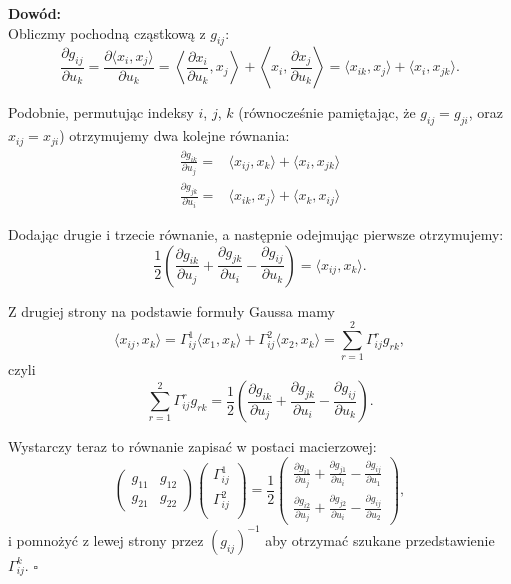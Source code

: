 \begin{frame}

\textcolor{ared}{\textbf{Dowód: }}\\\pause
Obliczmy pochodną cząstkową z $g_{ij}$:
\[\frac{\partial{g_{ij}}}{\partial u_k}=\frac{\partial\langle x_i,x_j \rangle}{\partial u_k}=\left\langle \frac{\partial x_i}{\partial u_k},x_j \right\rangle + \left\langle x_i,\frac{\partial x_j}{\partial u_k}\right\rangle=\langle x_{ik},x_j\rangle+\langle x_i,x_{jk}\rangle.\]


\pause Podobnie, permutując indeksy $i$, $j$, $k$ (równocześnie pamiętając, że $g_{ij}=g_{ji}$, oraz $x_{ij}=x_{ji}$) otrzymujemy dwa kolejne równania:
\begin{align*}
\frac{\partial{g_{ik}}}{\partial u_j}=&\langle x_{ij},x_k\rangle+\langle x_i,x_{jk}\rangle\\
\frac{\partial{g_{jk}}}{\partial u_i}=&\langle x_{ik},x_j\rangle+\langle x_k,x_{ij}\rangle
\end{align*}

\pause Dodając drugie i trzecie równanie, a następnie odejmując pierwsze otrzymujemy:
\[\frac{1}{2}\left(\frac{\partial{g_{ik}}}{\partial u_j}+\frac{\partial{g_{jk}}}{\partial u_i}- \frac{\partial{g_{ij}}}{\partial u_k}\right)=\langle x_{ij},x_{k}\rangle.\]

\end{frame}
\begin{frame}

Z drugiej strony na podstawie formuły Gaussa mamy 
\[\langle x_{ij},x_{k}\rangle=\Gamma^1_{ij}\langle x_1,x_k\rangle+ \Gamma^2_{ij}\langle x_2,x_k\rangle=\sum_{r=1}^2\Gamma^r_{ij}g_{rk},\]
\pause czyli 
\[\sum_{r=1}^2\Gamma^r_{ij}g_{rk}=\frac{1}{2}\left(\frac{\partial{g_{ik}}}{\partial u_j}+\frac{\partial{g_{jk}}}{\partial u_i}- \frac{\partial{g_{ij}}}{\partial u_k}\right).\]


\pause Wystarczy teraz to równanie zapisać w postaci macierzowej:
\[
\left(
\begin{array}{cc}
g_{11} & g_{12}\\
g_{21} & g_{22}
\end{array}
\right) 
\left(
\begin{array}{c}
\Gamma^1_{ij}\\
\Gamma^2_{ij}\\
\end{array}
\right)
=\frac{1}{2}\!
\left(
\begin{array}{c}
\frac{\partial g_{i1}}{\partial u_j}+\frac{\partial g_{j1}}{\partial u_i}-\frac{\partial g_{ij}}{\partial u_1}\\
\frac{\partial g_{i2}}{\partial u_j}+\frac{\partial g_{j2}}{\partial u_i}-\frac{\partial g_{ij}}{\partial u_2}
\end{array}
\right), 
\]
\pause i pomnożyć z lewej strony przez $(g_{ij})^{-1}$ aby otrzymać szukane przedstawienie $\Gamma^k_{ij}$.
\hfill $\square$

\end{frame}
